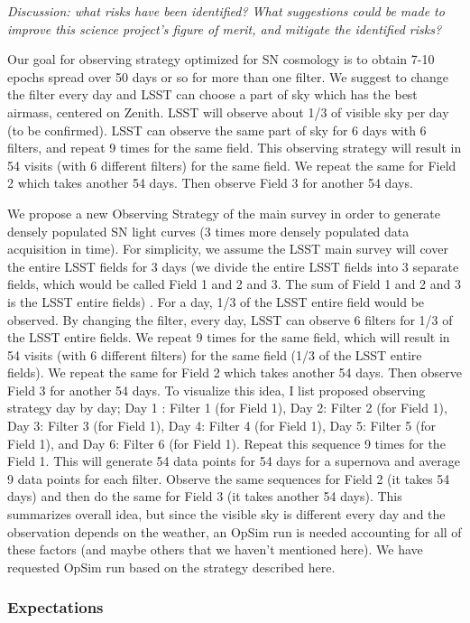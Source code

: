 {\it Discussion: what risks have been identified? What suggestions could be
made to improve this science project's figure of merit, and mitigate
the identified risks?}

Our goal for observing strategy optimized for SN cosmology is to
obtain 7-10 epochs spread over 50 days or so for more than one filter. We suggest to
change the filter every day and LSST can choose a part of sky which has the best airmass,
centered on Zenith. LSST will observe about 1/3 of visible sky per day (to be confirmed).
LSST can observe the same part of sky for 6 days with 6 filters, and repeat 9 times for
the same field. This observing strategy will result in 54 visits (with 6 different
filters) for the same field. We repeat the same for Field 2 which takes another 54 days.
Then observe Field 3 for another 54 days.

We propose a new Observing Strategy of the main survey in order to generate densely
populated SN light curves (3 times more densely populated data acquisition in time). For
simplicity, we assume the LSST main survey will cover the entire LSST fields for 3 days
(we divide the entire LSST fields into 3 separate fields, which would be called Field 1
and 2 and 3. The sum of Field 1 and 2 and 3 is the LSST entire fields) . For a day, 1/3 of
the LSST entire field would be observed. By changing the filter, every day, LSST can
observe 6 filters for 1/3 of the LSST entire fields. We repeat 9 times for the same field,
which will result in 54 visits (with 6 different filters) for the same field (1/3 of the
LSST entire fields). We repeat the same for Field 2 which takes another 54 days. Then
observe Field 3 for another 54 days. To visualize this idea, I list proposed observing
strategy day by day; Day 1 : Filter 1 (for Field 1), Day 2: Filter 2 (for Field 1), Day 3:
Filter 3 (for Field 1), Day 4: Filter 4 (for Field 1), Day 5: Filter 5 (for Field 1), and
Day 6: Filter 6 (for Field 1). Repeat this sequence 9 times for the Field 1. This will
generate 54 data points for 54 days for a supernova and average 9 data points for each
filter. Observe the same sequences for Field 2 (it takes 54 days) and then do the same for
Field 3 (it takes another 54 days). This summarizes overall idea, but since the visible
sky is different every day and the observation depends on the weather, an OpSim run is
needed accounting for all of these factors (and maybe others that we haven't mentioned
here). We have requested OpSim run based on the strategy described here.

\subsubsection{Expectations} 

